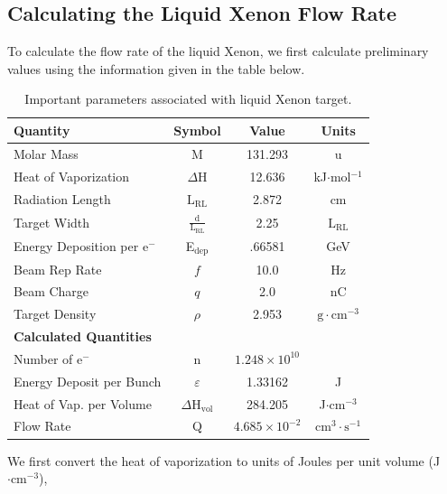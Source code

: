 \documentclass[%
reprint,
amsmath, amssymb,
aps,
floatfix,
]{revtex4-2}
\begin{document}
\subsection{Calculating the Liquid Xenon Flow Rate}
To calculate the flow rate of the liquid Xenon, we first calculate preliminary
values using the information given in the table below.

\begin{table}[H]
    \centering
    \begin{tabular}{lccc}
        \hline \hline
        \textbf{Quantity} & \textbf{Symbol} & \textbf{Value} & \textbf{Units} \\
        \hline
        Molar Mass & \textrm{M} & 131.293 & u \\
        Heat of Vaporization & $\Delta \textrm{H}$ & 12.636 & kJ$\cdot$mol$^{-1}$ \\
        Radiation Length & $\textrm{L}_{\textrm{RL}}$ & 2.872 & cm \\
        Target Width & $\frac{\textrm{d}}{\textrm{L}_{\textrm{RL}}}$ & 2.25 & $\textrm{L}_{\textrm{RL}}$ \\
        Energy Deposition per e$^-$ & E$_{\textrm{dep}}$ & .66581 & GeV \\
        Beam Rep Rate & $f$ & 10.0 & Hz \\
        Beam Charge & $q$ & 2.0 & nC \\
        Target Density & $\rho$ & 2.953 & $\textrm{g} \cdot \textrm{cm}^{-3}$ \\
        \hline \hline
        \textbf{Calculated Quantities} \\
        \hline
        Number of e$^-$ & n & $1.248 \times 10^{10}$ & \\
        Energy Deposit per Bunch & $\varepsilon$ & 1.33162 & J \\
        Heat of Vap. per Volume & $\Delta \textrm{H}_{\textrm{vol}}$ & 284.205 & J$\cdot \textrm{cm}^{-3}$ \\
        Flow Rate & Q & $4.685 \times 10^{-2}$ & cm$^3\cdot \textrm{s}^{-1}$ \\
        \hline \hline
    \end{tabular}
    \caption{\label{tab:XeInfo}Important parameters associated with liquid Xenon target.}
\end{table}
We first convert the heat of vaporization to units of Joules per unit volume (J$\cdot \textrm{cm}^{-3}$),
\end{document}
